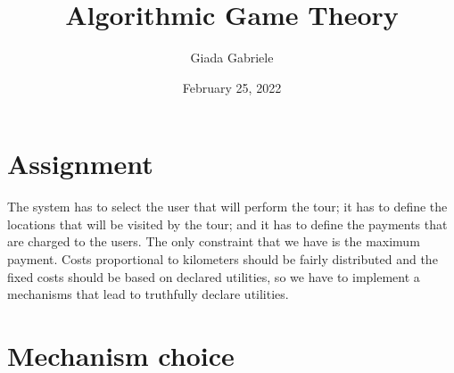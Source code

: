 \documentclass{article}
\title{Algorithmic Game Theory}
\author{Giada Gabriele}
\date{February 25, 2022}
\begin{document}
\maketitle
\section{Assignment}
\large{
The system has to select the user that will perform the tour; it has to define the locations that will be visited by the tour; and it has to define the payments that are charged to the users. The only constraint that we have is the maximum payment. Costs proportional to kilometers should be fairly distributed and the fixed costs should be based on declared utilities, so we have to implement a mechanisms that lead to truthfully declare utilities.
}
\section{Mechanism choice}
\end{document}
